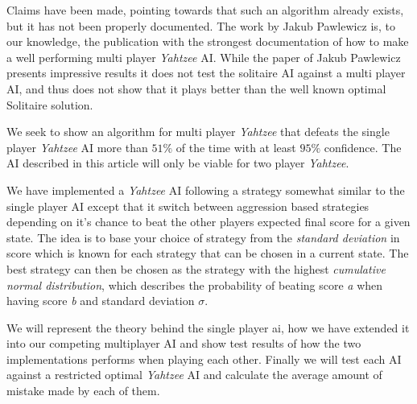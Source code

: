 Claims have been made, pointing towards that such an algorithm already exists, but it has not been properly documented.
The work by Jakub Pawlewicz is, to our knowledge, the publication with the strongest documentation of how to make a well performing multi player \emph{Yahtzee} AI.
While the paper of Jakub Pawlewicz\citep{pawlewicz2011nearly} presents impressive results it does not test the solitaire AI against a multi player AI, and thus does not show that it plays better than the well known optimal Solitaire solution.

We seek to show an algorithm for multi player \emph{Yahtzee} that defeats the single player \emph{Yahtzee} AI more than $51\%$ of the time with at least $95\%$ confidence.
The AI described in this article will only be viable for two player \emph{Yahtzee}.

We have implemented a \emph{Yahtzee} AI following a strategy somewhat similar to the single player AI except that it switch between aggression based strategies depending on it's chance to beat the other players expected final score for a given state. The idea is to base your choice of strategy from the \emph{standard deviation} in score which is known for each strategy that can be chosen in a current state. The best strategy can then be chosen as the strategy with the highest \emph{cumulative normal distribution}, which describes the probability of beating score \emph{a} when having score \emph{b} and standard deviation $\sigma$.

We will represent the theory behind the single player ai, how we have extended it into our competing multiplayer AI and show test results of how the two implementations performs when playing each other. 
Finally we will test each AI against a restricted optimal \emph{Yahtzee} AI and calculate the average amount of mistake made by each of them.

